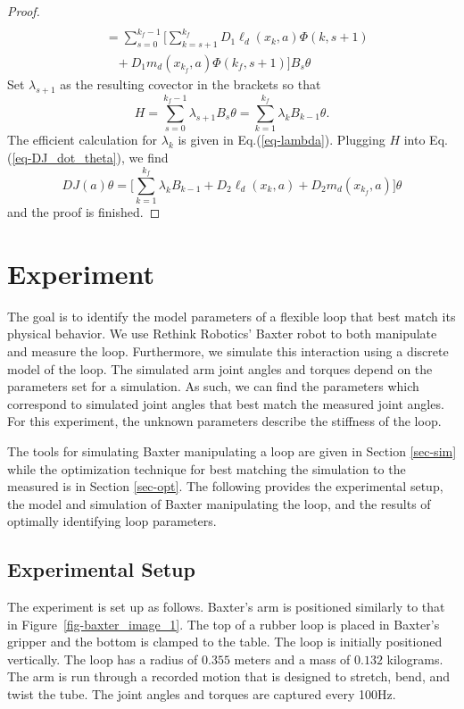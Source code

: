 \documentclass[letterpaper, 10pt, conference]{ieeeconf}
\begin{document}
\begin{proof}
\[\begin{array}{l}
\\\hspace{10pt} = \sum_{s=0}^{k_f-1}\Big[\sum_{k = s+1}^{k_f}D_1\ell_d(x_k,a) \Phi(k,s+1) \\\hspace{20pt}+ D_1m_d(x_{k_f},a)\Phi(k_f,s+1)\Big]B_s\theta
\end{array}
\]
Set $\lambda_{s+1}$ as the resulting covector in the brackets so that 
\[
H = \sum_{s=0}^{k_f-1} \lambda_{s+1} B_s\theta = \sum_{k=1}^{k_f} \lambda_{k} B_{k-1}\theta.
\]
The efficient calculation for $\lambda_k$ is given in Eq.(\ref{eq-lambda}).  Plugging $H$ into Eq.(\ref{eq-DJ_dot_theta}), we find
\[
DJ(a)\theta = \Big[\sum_{k = 1}^{k_f}\lambda_kB_{k-1} +D_2\ell_d(x_k,a) + D_2m_d(x_{k_f},a)\Big]\theta
\]
and the proof is finished.
\end{proof}

\section{Experiment}
The goal is to identify the model parameters of a flexible loop that best match its physical behavior.  We use Rethink Robotics' Baxter robot to both manipulate and measure the loop.  Furthermore, we simulate this interaction using a discrete model of the loop.  The simulated arm joint angles and torques depend on the parameters set for a simulation.  As such, we can find the parameters which correspond to simulated joint angles that best match the measured joint angles.  For this experiment, the unknown parameters describe the stiffness of the loop.

The tools for simulating Baxter manipulating a loop are given in Section \ref{sec-sim} while the optimization technique for best matching the simulation to the measured is in Section \ref{sec-opt}.  The following provides the experimental setup, the model and simulation of Baxter manipulating the loop, and the results of optimally identifying loop parameters.

\subsection{Experimental Setup}
The experiment is set up as follows.  Baxter's arm is positioned similarly to that in Figure~\ref{fig-baxter_image_1}.  The top of a rubber loop is placed in Baxter's gripper and the bottom is clamped to the table.   The loop is initially positioned vertically. The loop has a radius of $0.355$ meters and a mass of $0.132$ kilograms.  The arm is run through a recorded motion that is designed to stretch, bend, and twist the tube. The joint angles and torques are captured every 100Hz.  
\end{document}
